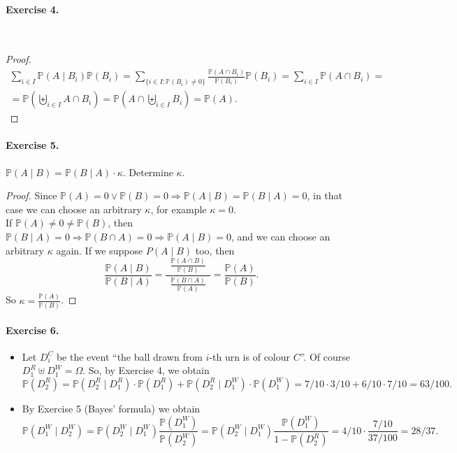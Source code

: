 \documentclass[12pt,a4paper]{report}
\theoremstyle{definition}
\theoremstyle{num.custom-title}
\DeclareMathOperator{\imp}{\Rightarrow}
\renewcommand{\P}{\mathbb{P}}
\renewcommand{\1}{\mathbbm{1}}
\begin{document}
\paragraph{Exercise 4.} \
\begin{proof}
\begin{multline*}
\sum_{i \in I} \P(A \mid B_i) \P(B_i) = \sum_{\{i \in I : \P(B_i)\ne 0\}} \frac{\P(A \cap B_i)}{\P(B_i)} \P(B_i) = \sum_{i \in I} \P(A \cap B_i) = \\
 = \P \left( \biguplus_{i \in I} A \cap B_i \right) = \P \left( A \cap \biguplus_{i \in I} B_i \right) = \P(A).
\end{multline*}
\end{proof}

\paragraph{Exercise 5.} $\P(A \mid B)=\P(B \mid A) \cdot \kappa$. Determine $\kappa$.
\begin{proof}
Since $\P(A)=0 \vee \P(B)=0 \imp \P(A \mid B)=\P(B \mid A)=0$, in that case we can choose an arbitrary $\kappa$, for example $\kappa=0$.\\
If $\P(A) \ne 0 \ne \P(B)$, then $\P(B \mid A)=0 \imp \P(B \cap A)=0 \imp \P(A \mid B)=0$, and we can choose an arbitrary $\kappa$ again. If we suppose $P(A \mid B)$ too, then
\[
\frac{\P(A \mid B)}{\P(B \mid A)} = \frac{\ \ \frac{\P(A \cap B)}{\P(B)} \ \ }{\frac{\P(B \cap A)}{\P(A)}} = \frac{\P(A)}{\P(B)}.
\]
So $\kappa=\frac{\P(A)}{\P(B)}$.
\end{proof}

\paragraph{Exercise 6.}
\begin{itemize}
\item Let $D_i^C$ be the event ``the ball drawn from $i$-th urn is of colour $C$''. Of course $D_1^R \uplus D_1^W = \Omega$. So, by Exercise 4, we obtain
\[
\P(D_2^R) = \P(D_2^R \mid D_1^R) \cdot \P(D_1^R) + \P(D_2^R \mid D_1^W) \cdot \P(D_1^W) = 7/10 \cdot 3/10 + 6/10 \cdot 7/10 = 63/100.
\]
\item By Exercise 5 (Bayes' formula) we obtain
\[
\P(D_1^W \mid D_2^W) = \P(D_2^W \mid D_1^W) \frac{\P(D_1^W)}{\P(D_2^W)} = \P(D_2^W \mid D_1^W) \frac{\P(D_1^W)}{1-\P(D_2^R)} = 4/10 \cdot \frac{7/10}{37/100}=28/37.
\]
\end{itemize}
\end{document}
